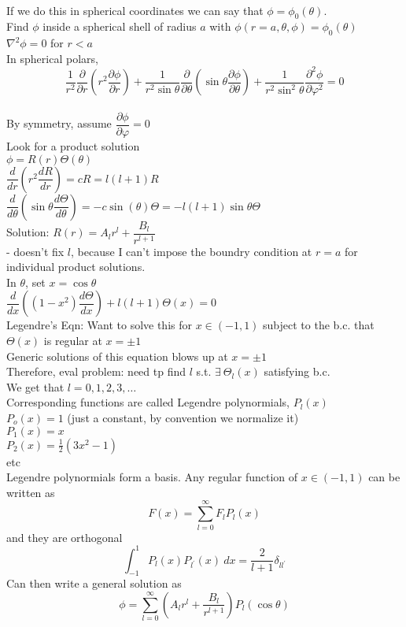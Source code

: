 \documentclass[a4paper,11pt]{article}
\newcommand{\pd}[2]{\dfrac{\partial #1}{\partial #2}}
\newcommand{\od}[2]{\dfrac{d #1}{d #2}}
\newcommand{\lap}{\nabla^2}
\begin{document}
{\\
If we do this in spherical coordinates we can say that $\phi=\phi_0(\theta)$.\\
Find $\phi$ inside a spherical shell of radius $a$ with $\phi(r=a,\theta,\phi)=\phi_0(\theta)$\\
$\lap\phi=0$ for $r<a$\\
In spherical polars,
$$\dfrac{1}{r^2}\pd{}{r}\left(r^2\pd{\phi}{r}\right)+\dfrac{1}{r^2\sin\theta}\pd{}{\theta}\left(\sin\theta\pd{\phi}{\theta}\right)+\dfrac{1}{r^2\sin^2\theta}\pd{^2\phi}{\varphi^2}=0$$\\
By symmetry, assume $\pd{\phi}{\varphi}=0$\\
Look for a product solution\\
$\phi=R(r)\Theta(\theta)$\\
$\od{}{r}\left(r^2\od{R}{r}\right)=cR=l(l+1)R$\\
$\od{}{\theta}\left(\sin\theta\od{\Theta}{\theta}\right)=-c\sin(\theta) \Theta=-l(l+1)\sin\theta\Theta$\\
Solution: $R(r)=A_lr^l+\dfrac{B_l}{r^{l+1}}$\\
- doesn't fix $l$, because I can't impose the boundry condition at $r=a$ for individual product solutions.\\
In $\theta$, set $x=\cos\theta$\\
$\od{}{x}\left((1-x^2)\od{\Theta}{x}\right)+l(l+1)\Theta(x)=0$\\
Legendre's Eqn: Want to solve this for $x\in(-1,1)$ subject to the b.c. that $\Theta(x)$ is regular at $x=\pm1$\\
Generic solutions of this equation blows up at $x=\pm 1$\\
Therefore, eval problem: need tp find $l$ s.t. $\exists~\Theta_l(x)$ satisfying b.c.\\
We get that $l=0,1,2,3,\ldots$\\
Corresponding functions are called Legendre polynormials, $P_l(x)$\\
$P_o(x)=1$ (just a constant, by convention we normalize it)\\
$P_1(x)=x$\\
$P_2(x)=\frac{1}{2}(3x^2-1)$\\
etc\\
Legendre polynormials form a basis. Any regular function of $x\in(-1,1)$ can be written as
$$F(x)=\sum^\infty_{l=0}F_l P_l(x)$$
and they are orthogonal
$$\int^1 _{-1}P_l(x)P_{l^\prime}(x)~dx=\dfrac{2}{l+1}\delta_{ll^\prime}$$
Can then write a general solution as 
$$\phi=\sum_{l=0}^\infty\left(A_lr^l+\dfrac{B_l}{r^{l+1}}\right)P_l (\cos\theta)$$
}
\end{document}

